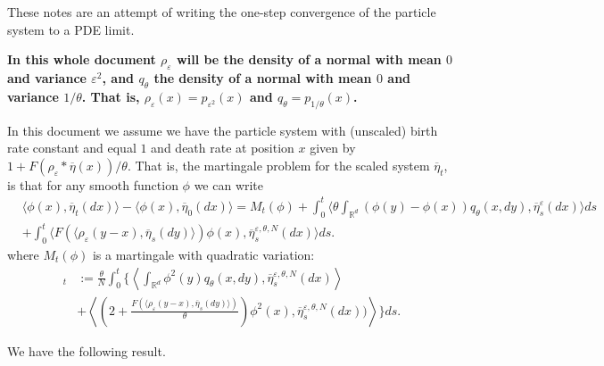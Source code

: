 \documentclass[a4paper,12pt]{article}
\newcommand{\1}{{\bf {1}}}
\def\epsilon{\varepsilon}
\begin{document}
These notes are an attempt of writing the one-step convergence of the particle system to a PDE limit.

\textbf{In this whole document $\rho_\epsilon$ will be the density of a normal with mean $0$ and variance $\epsilon^2$, and $q_\theta$ the density of a normal with mean $0$ and variance $1/\theta$. That is, $\rho_\epsilon(x) = p_{\epsilon^2}(x)$ and $q_\theta = p_{1/\theta}(x)$.}

In this document we assume we have the particle system with (unscaled) birth rate constant and equal $1$ and death rate at position $x$ given by $1+F(\rho_\epsilon*\overline{\eta}(x))/\theta$. That is, the martingale problem for the scaled system $\overline{\eta}_t$, is that for any smooth function $\phi$ we can write
\begin{align}
&\langle\phi(x),\overline{\eta}_{t}(dx)\rangle-\langle\phi(x),\overline{\eta}_{0}(dx)\rangle = M_t(\phi)   + \int_{0}^{t}\langle \theta  \int_{\mathbb{R}^d} \left( \phi(y)-\phi(x)\right) q_\theta(x,dy), \overline{\eta}_s^\epsilon(dx) \rangle ds \nonumber \\
 & + \int_0^t \langle  F(\langle \rho_\epsilon(y-x), \overline{\eta}_s(dy) \rangle)\phi(x),\overline{\eta}_s^{\varepsilon, \theta, N}(dx)  \rangle ds. \label{mgp1}
\end{align}
where $M_t(\phi)$ is a martingale with quadratic variation:
\begin{align}
[M(\phi)]_t&:=\frac{\theta}{N}\int_{0}^{t}\bigg\{ \left\langle \int_{\mathbb{R}^d} \phi^2(y) q_\theta(x,dy), \overline{\eta}_s^{\varepsilon, \theta, N}(dx) \right\rangle \nonumber\\
&+ \left\langle  \left(2 + \frac{F(\langle \rho_\epsilon(y-x), \overline{\eta}_s(dy)\rangle )}{\theta } \right)\phi^2(x), \overline{\eta}_s^{\varepsilon, \theta, N}(dx))\right\rangle   \bigg\}ds.  \label{mgp2}
\end{align}

We have the following result.
\end{document}
